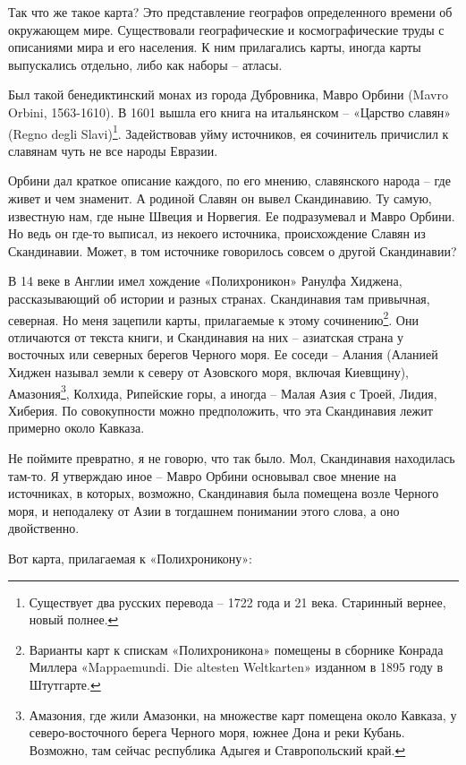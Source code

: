 Так что же такое карта? Это представление географов определенного времени об окружающем мире. Существовали географические и космографические труды с описаниями мира и его населения. К ним прилагались карты, иногда карты выпускались отдельно, либо как наборы – атласы.

Был такой бенедиктинский монах из города Дубровника, Мавро Орбини (Mavro Orbini, 1563-1610). В 1601 вышла его книга на итальянском – «Царство славян» (Regno degli Slavi)\footnote{Существует два русских перевода – 1722 года и 21 века. Старинный вернее, новый полнее.}. Задействовав уйму источников, ея сочинитель причислил к славянам чуть не все народы Евразии.

Орбини дал краткое описание каждого, по его мнению, славянского народа – где живет и чем знаменит. А родиной Славян он вывел  Скандинавию. Ту самую, известную нам, где ныне Швеция и Норвегия. Ее подразумевал и Мавро Орбини. Но ведь он где-то выписал, из некоего источника, происхождение Славян из Скандинавии. Может, в том источнике говорилось совсем о другой Скандинавии?

В 14 веке в Англии имел хождение «Полихроникон» Ранулфа Хиджена\cite{polychro}, рассказывающий об истории и разных странах. Скандинавия там привычная, северная. Но меня зацепили карты, прилагаемые к этому сочинению\footnote{Варианты карт к спискам «Полихроникона» помещены в сборнике Конрада Миллера «Mappaemundi. Die altesten Weltkarten» изданном в 1895 году в Штутгарте.}. Они отличаются от текста книги, и Скандинавия на них – азиатская страна у восточных или северных берегов Черного моря. Ее соседи – Алания (Аланией Хиджен называл земли к северу от Азовского моря, включая Киевщину), Амазония\footnote{Амазония, где жили Амазонки, на множестве карт помещена около Кавказа, у северо-восточного берега Черного моря, южнее Дона и реки Кубань. Возможно, там сейчас республика Адыгея и Ставропольский край.}, Колхида, Рипейские горы, а иногда – Малая Азия с Троей, Лидия, Хиберия. По совокупности можно предположить, что эта Скандинавия лежит примерно около Кавказа.

Не поймите превратно, я не говорю, что так было. Мол, Скандинавия находилась там-то. Я утверждаю иное – Мавро Орбини основывал свое мнение на источниках, в которых, возможно, Скандинавия была помещена возле Черного моря, и неподалеку от Азии в тогдашнем понимании этого слова, а оно двойственно.

Вот карта, прилагаемая к «Полихроникону»:

